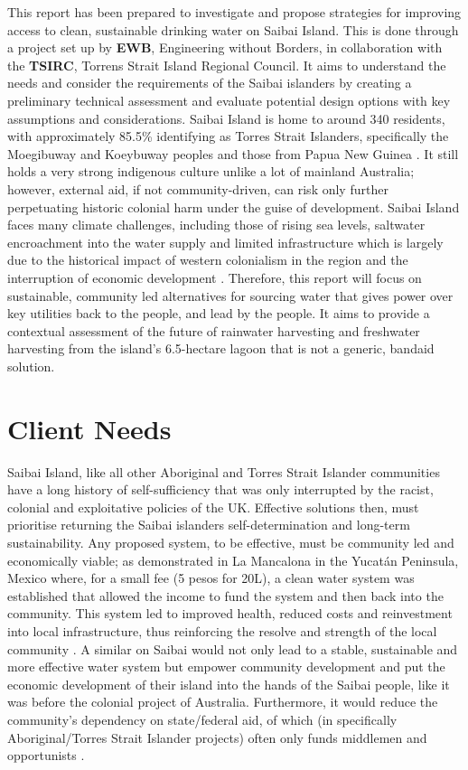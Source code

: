 \documentclass[a4paper,12pt]{report}
\begin{document}
This report has been prepared to investigate and propose strategies for improving access to clean, sustainable drinking water on Saibai Island. This is done through a project set up by \textbf{EWB}, Engineering without Borders, in collaboration with the \textbf{TSIRC}, Torrens Strait Island Regional Council. It aims to understand the needs and consider the requirements of the Saibai islanders by creating a preliminary technical assessment and evaluate potential design options with key assumptions and considerations. Saibai Island is home to around 340 residents, with approximately 85.5\% identifying as Torres Strait Islanders, specifically the Moegibuway and Koeybuway peoples and those from Papua New Guinea \citep{indigenous_gov_2023}. It still holds a very strong indigenous culture unlike a lot of mainland Australia; however, external aid, if not community-driven, can risk only further perpetuating historic colonial harm under the guise of development. Saibai Island faces many climate challenges, including those of rising sea levels, saltwater encroachment into the water supply and limited infrastructure which is largely due to the historical impact of western colonialism in the region and the interruption of economic development \citep{ewb_saibai_2024}. Therefore, this report will focus on sustainable, community led alternatives for sourcing water that gives power over key utilities back to the people, and lead by the people. It aims to provide a contextual assessment of the future of rainwater harvesting and freshwater harvesting from the island's 6.5-hectare lagoon that is not a generic, bandaid solution.

\section{Client Needs}

Saibai Island, like all other Aboriginal and Torres Strait Islander communities have a long history of self-sufficiency that was only interrupted by the racist, colonial and exploitative policies of the UK. Effective solutions then, must prioritise returning the Saibai islanders self-determination and long-term sustainability. Any proposed system, to be effective, must be community led and economically viable; as demonstrated in La Mancalona in the Yucatán Peninsula, Mexico where, for a small fee (5 pesos for 20L), a clean water system was established that allowed the income to fund the system and then back into the community. This system led to improved health, reduced costs and reinvestment into local infrastructure, thus reinforcing the resolve and strength of the local community \citep{la_mancalona}. A similar on Saibai would not only lead to a stable, sustainable and more effective water system but empower community development and put the economic development of their island into the hands of the Saibai people, like it was before the colonial project of Australia. Furthermore, it would reduce the community's dependency on state/federal aid, of which (in specifically Aboriginal/Torres Strait Islander projects) often only funds middlemen and opportunists \citep{corruption_indigenous}.
\end{document}
